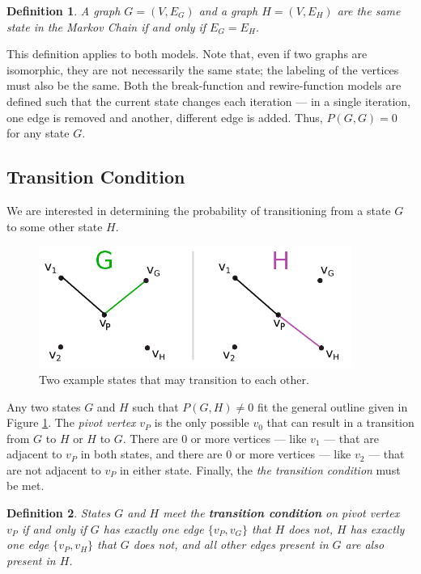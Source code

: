 \documentclass[a4paper,10pt]{article}
\newtheorem{defn}{Definition}
\begin{document}
\begin{defn}
 A graph $G = (V, E_G)$ and a graph $H = (V, E_H)$ are the same state in the Markov Chain if and only if $E_G = E_H$.
\end{defn}

This definition applies to both models. Note that, even if two graphs are isomorphic, they are not necessarily the same state; the labeling of the vertices must also be the same. Both the break-function and rewire-function models are defined such that the current state changes each iteration --- in a single iteration, one edge is removed and another, different edge is added. Thus, $P(G, G) = 0$ for any state $G$.

\subsection{Transition Condition}
We are interested in determining the probability of transitioning from a state $G$ to some other state $H$.

 \begin{center}
\begin{figure}[H]
  \includegraphics[height=4.0cm]{images/transition_prob.png}
  \caption{Two example states that may transition to each other.}
 \label{fig:example-states}

\end{figure}
 \end{center}

Any two states $G$ and $H$ such that $P(G, H) \neq 0$ fit the general outline given in Figure \ref{fig:example-states}. The \emph{pivot vertex} $v_P$ is the only possible $v_0$ that can result in a transition from $G$ to $H$ or $H$ to $G$. There are 0 or more vertices --- like $v_1$ --- that are adjacent to $v_P$ in both states, and there are 0 or more vertices --- like $v_2$ --- that are not adjacent to $v_P$ in either state. Finally, the \emph{the transition condition} must be met.

\begin{defn}
 States $G$ and $H$ meet the \textbf{transition condition} on pivot vertex $v_P$ if and only if $G$ has exactly one edge $\{v_P, v_G\}$ that $H$ does not, $H$ has exactly one edge $\{v_P, v_H\}$ that $G$ does not, and all other edges present in $G$ are also present in $H$. 
\end{defn}
\end{document}
